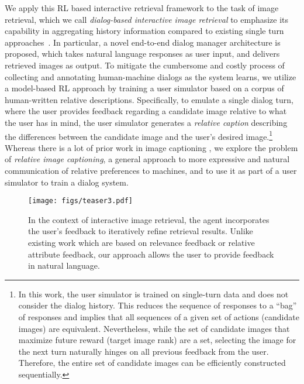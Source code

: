 We apply this RL based interactive retrieval framework to the task of image retrieval,
which we call {\em dialog-based interactive image retrieval} to emphasize its capability in aggregating history information compared to existing single turn approaches~\cite{tellex2009towards,barbu2013saying,li2017person,hu2016natural}.  In particular, a 
novel end-to-end dialog manager architecture is proposed, which takes natural language 
responses as user input, and delivers retrieved images as output. 
To mitigate the cumbersome and costly process of collecting and annotating 
human-machine dialogs as the system learns, 
we utilize a model-based RL approach by training a user simulator based on a corpus of human-written relative descriptions. Specifically, to emulate a single dialog turn, where the user provides feedback regarding a candidate image relative to what the user has in mind, the user simulator generates a {\em relative caption} describing the differences between the candidate image and the user's desired image.\footnote{In this work, the user simulator is trained on single-turn data and does not consider the dialog history. This reduces the sequence of responses to a ``bag'' of responses and implies that all sequences of a given set of actions (candidate images) are equivalent. Nevertheless, while the set of candidate images that maximize future reward (target image rank) are a set, selecting the image for the next turn naturally hinges on all previous feedback from the user. Therefore, the entire set of candidate
images can be efficiently constructed sequentially. }
Whereas there is a lot of prior work in image captioning \cite{kulkarni2011baby,vinyals2015show,rennie2016self}, 
we %
explore the problem of {\em relative image captioning}, a general approach to more expressive and natural communication of relative preferences to machines, and 
to use it as part of a user simulator to train a dialog system. 

\begin{figure}[t]
\begin{center}
\texttt{[image: figs/teaser3.pdf]}
\end{center}
\caption{In the context of interactive image retrieval, the agent incorporates the user's 
feedback to iteratively refine retrieval results. Unlike existing work which 
are based on relevance feedback or relative attribute feedback, our approach 
allows the user to provide feedback in natural language. 
\vspace{-0.05em}
}
\label{fig:teaser}
\end{figure}

